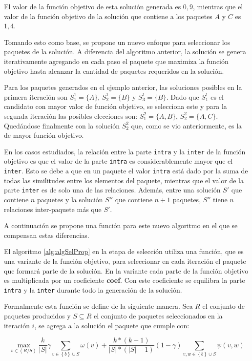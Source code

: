El valor de la función objetivo de esta solución generada es $0,9$, mientras que el valor de la función objetivo de la solución que contiene a los paquetes $A$ y $C$ es $1,4$.

Tomando esto como base, se propone un nuevo enfoque para seleccionar los paquetes de la solución. A diferencia del algoritmo anterior, la solución se genera iterativamente agregando en cada paso el paquete que maximiza la función objetivo hasta alcanzar la cantidad de paquetes requeridos en la solución.

Para los paquetes generados en el ejemplo anterior, las soluciones posibles en la primera iteración son $S^{1}_{1}=\{A\}$, $S^{1}_{2}=\{B\}$ y $S^{1}_{3}=\{B\}$. Dado que $S^{1}_{1}$ es el candidato con mayor valor de función objetivo, se selecciona este y para la segunda iteración las posibles elecciones son:  $S^{2}_{1}=\{A,B\}$, $S^{2}_{2}=\{A,C\}$. Quedándose finalmente con la solución $S^{2}_{2}$ que, como se vio anteriormente, es la de mayor función objetivo.

En los casos estudiados, la relación entre la parte \texttt{intra} y la \texttt{inter} de la función objetivo es que el valor de la parte \texttt{intra} es considerablemente mayor que el \texttt{inter}. Esto se debe a que en un paquete el valor \texttt{intra} está dado por la suma de todas las similitudes entre los elementos del paquete, mientras que el valor de la parte \texttt{inter} es de solo una de las relaciones. Además, entre una solución $S'$ que contiene $n$ paquetes y la solución $S''$ que contiene $n+1$ paquetes, $S''$ tiene $n$ relaciones inter-paquete más que $S'$. 

A continuación se propone una función para este nuevo algoritmo en el que se compensan estas diferencias.

El algoritmo \ref{alg:algSelProp} en la etapa de selección utiliza una función, que es una variante de la función objetivo, para seleccionar en cada iteración el paquete que formará parte de la solución. En la variante cada parte de la función objetivo es multiplicada por un coeficiente \textbf{coef}. Con este coeficiente se equilibra la parte \texttt{intra} y la \texttt{inter} durante todo la generación de la solución.   

Formalmente esta función se define de la siguiente manera. Sea $R$ el conjunto de paquetes producidos y $S \subseteq R$ el conjunto de paquetes seleccionados en la iteración $i$, se agrega a la solución el paquete que cumple con:

\begin{equation}
\max_{b \in (R/S)}{\dfrac{k}{|S|}} \gamma \sum_{v \in \left\{b\right\} \cup S}{\omega(v)} + \dfrac{k * (k-1)}{|S| * (|S|-1)} (1-\gamma) \sum_{v,w \in \left\{b\right\} \cup S}{\psi(v,w)}
\end{equation}

